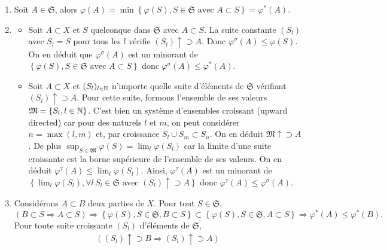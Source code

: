 \begin{demo}
 \begin{enumerate}
  \item Soit $A \in \mathfrak{S}$, alors $\varphi(A)= \min \left\lbrace \varphi(S), S \in \mathfrak{S} \text{ avec } A \subset S \right\rbrace = \varphi^*(A)$.
  \item \begin{itemize}
         \item Soit $A \subset X$ et $S$ quelconque dans $\mathfrak{S}$ avec $A \subset S$. La suite constante $(S_l)$ avec $S_l = S$ pour tous les $l$ vérifie $(S_l) \uparrow \supset A$. Donc $\varphi^\sigma(A) \leq \varphi(S)$. On en déduit que $\varphi^\sigma(A)$ est un minorant de $\left\lbrace \varphi(S), S \in \mathfrak{S} \text{ avec } A \subset S \right\rbrace$ donc $\varphi^\sigma(A) \leq \varphi^*(A)$.
        \item Soit $A \subset X$ et $(S_l)_{l\in \mathbb{N}}$ n'importe quelle suite d'éléments de $\mathfrak{S}$ vérifiant $(S_l) \uparrow \supset A$. Pour cette suite, formons l'ensemble de ses valeurs $\mathfrak{M}= \left\lbrace S_l, l\in \mathbb{N} \right\rbrace$. C'est bien un système d'ensembles croissant (upward directed) car pour des naturels $l$ et $m$, on peut considérer $n = \max(l,m)$ et, par croissance $S_l \cup S_m \subset S_n$. On en déduit $\mathfrak{M}\uparrow \supset A$. De plus $\sup_{S \in \mathfrak{M}} \varphi(S)=\lim_{l}  \varphi(S_l)$ car la limite d'une suite croissante est la borne supérieure de l'ensemble de ses valeurs. On en déduit $\varphi^\tau (A) \leq \lim_{l}  \varphi(S_l)$. Ainsi, $\varphi^\tau(A)$ est un minorant de $\left\lbrace \lim_{l}  \varphi(S_l), \forall l \, S_l\in \mathfrak{S} \text{ avec } (S_l) \uparrow \supset A \right\rbrace$ donc $\varphi^\tau(A) \leq \varphi^\sigma(A)$.
        \end{itemize}
  \item Considérons $A \subset B$ deux parties de $X$.
    Pour tout $S \in \mathfrak{S}$,
\begin{displaymath}
 \left( B \subset S \Rightarrow A \subset S \right)
   \Rightarrow
   \left\lbrace \varphi(S), S \in \mathfrak{S}, B \subset S\right\rbrace \subset \left\lbrace \varphi(S), S \in \mathfrak{S}, A \subset S\right\rbrace
   \Rightarrow
   \varphi^*(A) \leq \varphi^*(B).
\end{displaymath}
    Pour toute suite croissante $(S_l)$ d'éléments de $\mathfrak{S}$,
\begin{multline*}
 \left( (S_l)\uparrow \supset B \Rightarrow (S_l) \uparrow \supset A \right) \\

\end{multline*}
\end{enumerate}
\end{demo}
